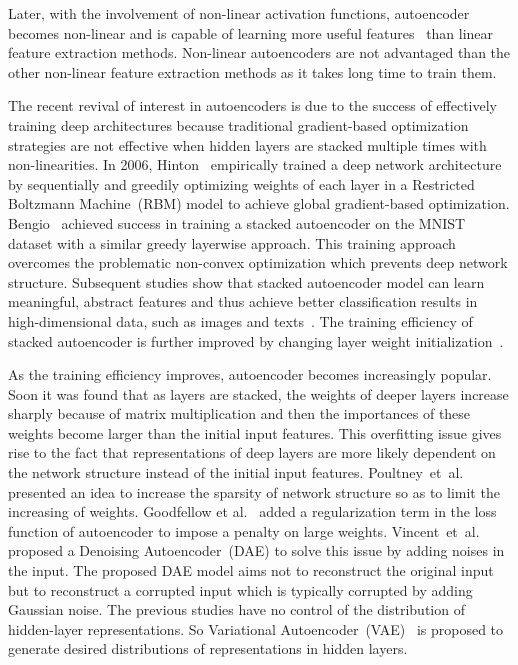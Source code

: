 \documentclass[conference]{IEEEtran}
\begin{document}
	Later, with the involvement of non-linear activation functions, autoencoder becomes non-linear and is capable of learning more useful features~\cite{japkowicz2000nonlinear} than linear feature extraction methods. Non-linear autoencoders are not advantaged than the other non-linear feature extraction methods as it takes long time to train them.
	
	The recent revival of interest in autoencoders is due to the success of effectively training deep architectures because traditional gradient-based optimization strategies are not effective when hidden layers are stacked multiple times with non-linearities. In 2006, Hinton~\cite{hinton2006reducing} empirically trained a deep network architecture by sequentially and greedily optimizing weights of each layer in a Restricted Boltzmann Machine~(RBM) model to achieve global gradient-based optimization. Bengio~\cite{larochelle2007empirical} achieved success in training a stacked autoencoder on the MNIST dataset with a similar greedy layerwise approach. This training approach overcomes the problematic non-convex optimization which prevents deep network structure. Subsequent studies show that stacked autoencoder model can learn meaningful, abstract features and thus achieve better classification results in high-dimensional data, such as images and texts~\cite{jarrett2009best, vincent2009international, ng2016dual, shin2013stacked}. The training efficiency of stacked autoencoder is further improved by changing layer weight initialization~\cite{erhan2010does}.
	
	As the training efficiency improves, autoencoder becomes increasingly popular. Soon it was found that as layers are stacked, the weights of deeper layers increase sharply because of matrix multiplication and then the importances of these weights become larger than the initial input features. This overfitting issue gives rise to the fact that representations of deep layers are more likely dependent on the network structure instead of the initial input features. Poultney~et~al.~\cite{poultney2006efficient} presented an idea to increase the sparsity of network structure so as to limit the increasing of weights. Goodfellow et al.~\cite{goodfellow2009measuring} added a regularization term in the loss function of autoencoder to impose a penalty on large weights. Vincent~et~al.~\cite{vincent2010stacked} proposed a Denoising Autoencoder~(DAE) to solve this issue by adding noises in the input. The proposed DAE model aims not to reconstruct the original input but to reconstruct a corrupted input which is typically corrupted by adding Gaussian noise. The previous studies have no control of the distribution of hidden-layer representations. So Variational Autoencoder~(VAE)~\cite{goodfellow2014generative} is proposed to generate desired distributions of representations in hidden layers.
	
\end{document}
